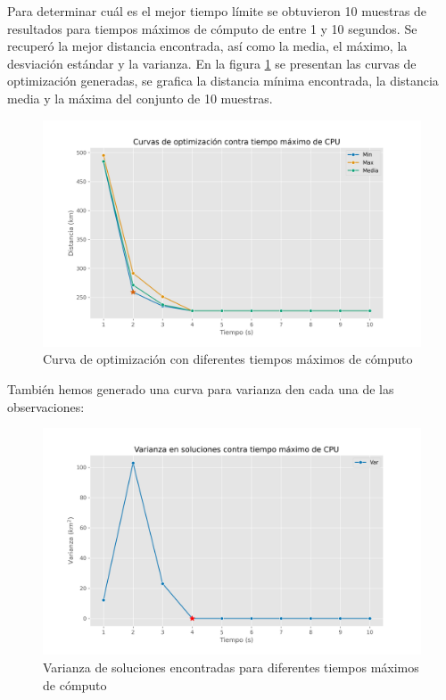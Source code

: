 \documentclass[journal]{IEEEtran}
\begin{document}
            Para determinar cuál es el mejor tiempo límite se obtuvieron 10 muestras de resultados para tiempos máximos de cómputo de entre 1 y 10 segundos. Se recuperó la mejor distancia encontrada, así como la media, el máximo, la desviación estándar y la varianza. En la figura \ref{fig:optim-curves} se presentan las curvas de optimización generadas, se grafica la distancia mínima encontrada, la distancia media y la máxima del conjunto de 10 muestras.
            \begin{figure}[h!]
                \centering
                \includegraphics[scale=0.35]{../img/curvas-opt.png}
                \caption{Curva de optimización con diferentes tiempos máximos de cómputo}
                \label{fig:optim-curves}
            \end{figure}

            También hemos generado una curva para varianza den cada una de las observaciones:

            \begin{figure}[h!]
                \centering
                \includegraphics[scale=0.35]{../img/varianza-opt.png}
                \caption{Varianza de soluciones encontradas para diferentes tiempos máximos de cómputo}
                \label{fig:optim-var}
            \end{figure}
\end{document}
